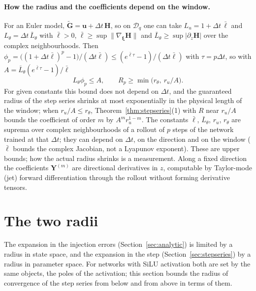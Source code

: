 \documentclass[11pt]{article}
\theoremstyle{definition}
\theoremstyle{remark}
\newcommand{\uu}{\mathbf{u}}
\newcommand{\Gt}{\tilde{\mathbf{G}}}
\newcommand{\Hop}{\mathbf{H}}
\newcommand{\dt}{\Delta t}
\begin{document}
\paragraph{How the radius and the coefficients depend on the window.}
For an Euler model, $\Gt=\uu+\dt\,\Hop$, so on $\mathcal D_q$ one can take $L_u=1+\dt\,\bar\ell$ and $L_\theta=\dt\,\bar L_\theta$ with $\bar\ell>0$, $\bar\ell\ge\sup\|\nabla_{\bm\xi}\Hop\|$ and $\bar L_\theta\ge\sup|\partial_z\Hop|$ over the complex neighbourhoods.
Then $\phi_p=\big((1+\dt\bar\ell)^p-1\big)/(\dt\bar\ell)\le(e^{\bar\ell\tau}-1)/(\dt\bar\ell)$ with $\tau=p\dt$, so with $A=\bar L_\theta(e^{\bar\ell\tau}-1)/\bar\ell$
\[
L_\theta\phi_p\le A,\qquad R_p\ge\min\big(r_\theta,\ r_u/A\big).
\]
For given constants this bound does not depend on $\dt$, and the guaranteed radius of the step series shrinks at most exponentially in the physical length of the window; when $r_u/A\le r_\theta$, Theorem~\ref{thm:stepseries}(1) with $R$ near $r_u/A$ bounds the coefficient of order $m$ by $A^mr_u^{1-m}$.
The constants $\bar\ell$, $\bar L_\theta$, $r_u$, $r_\theta$ are suprema over complex neighbourhoods of a rollout of $p$ steps of the network trained at that $\dt$; they can depend on $\dt$, on the direction and on the window ($\bar\ell$ bounds the complex Jacobian, not a Lyapunov exponent). These are upper bounds; how the actual radius shrinks is a measurement.
Along a fixed direction the coefficients $\mathbf Y^{(m)}$ are directional derivatives in $z$, computable by Taylor-mode (jet) forward differentiation through the rollout without forming derivative tensors.

\section{The two radii}\label{sec:tworadii}

The expansion in the injection errors (Section~\ref{sec:analytic}) is limited by a radius in state space, and the expansion in the step (Section~\ref{sec:stepseries}) by a radius in parameter space.
For networks with SiLU activation both are set by the same objects, the poles of the activation; this section bounds the radius of convergence of the step series from below and from above in terms of them.
\end{document}
